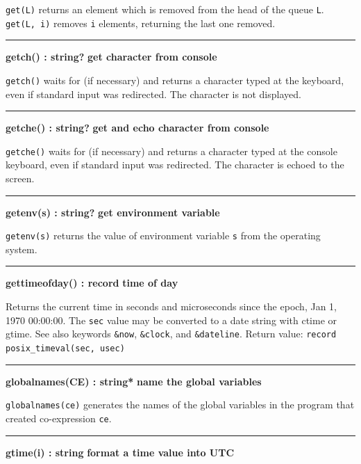 \noindent
\texttt{get(L)} returns an element which is removed from the head of the
queue \texttt{L}. \texttt{get(L, i)} removes \texttt{i}
elements, returning the last one removed.

\bigskip\hrule\vspace{0.1cm}
\noindent
{\bf getch() : string? } \hfill {\bf get character from console}

\noindent
\texttt{getch()} waits for (if necessary) and returns a character typed
at the keyboard, even if standard input was redirected.
The character is not displayed.

\bigskip\hrule\vspace{0.1cm}
\noindent
{\bf getche() : string? } \hfill {\bf get and echo character from console}

\noindent
\texttt{getche()} waits for (if necessary) and returns a character typed
at the console keyboard, even if standard input was redirected. The
character is echoed to the screen.

\bigskip\hrule\vspace{0.1cm}
\noindent
{\bf getenv(s) : string? } \hfill {\bf get environment variable}

\noindent
\texttt{getenv(s)} returns the value of
environment variable \texttt{s}
from the operating system.

\bigskip\hrule\vspace{0.1cm}
\noindent
{\bf gettimeofday() : record } \hfill {\bf time of day}

\noindent
{}Returns the current time in seconds and microseconds
since the epoch, Jan 1, 1970 00:00:00. The \texttt{sec} value may be
converted to a date string with ctime or gtime. See also keywords
\texttt{\&now}, \texttt{\&clock}, and \texttt{\&dateline}. Return
value: \texttt{record posix\_timeval(sec, usec)} 

\bigskip\hrule\vspace{0.1cm}
\noindent
{\bf globalnames(CE) : string* } \hfill {\bf name the global variables}

\noindent
{}\texttt{globalnames(ce)} generates the names of the global
variables in the program that created co-expression \texttt{ce}.

\bigskip\hrule\vspace{0.1cm}
\noindent
{\bf gtime(i) : string } \hfill {\bf format a time value into UTC }

